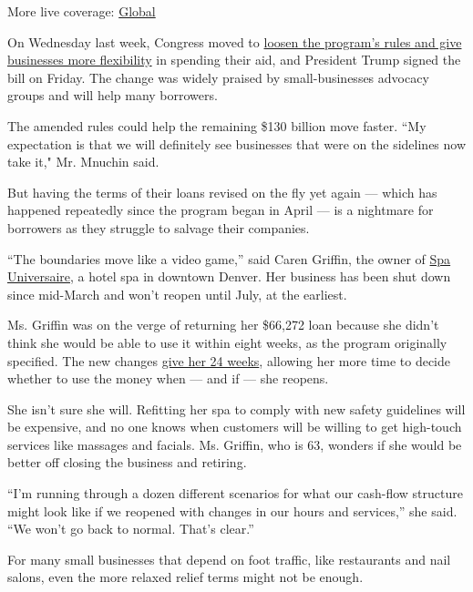 More live coverage:
\href{https://www.nytimes3xbfgragh.onion/2020/08/04/world/coronavirus-cases.html?action=click\&pgtype=Article\&state=default\&region=MAIN_CONTENT_1\&context=storylines_live_updates}{Global}

On Wednesday last week, Congress moved to
\href{https://www.nytimes3xbfgragh.onion/2020/06/03/business/stock-market-today-coronavirus.html\#link-7a1554a7}{loosen
the program's rules and give businesses more flexibility} in spending
their aid, and President Trump signed the bill on Friday. The change was
widely praised by small-businesses advocacy groups and will help many
borrowers.

The amended rules could help the remaining \$130 billion move faster.
``My expectation is that we will definitely see businesses that were on
the sidelines now take it," Mr. Mnuchin said.

But having the terms of their loans revised on the fly yet again ---
which has happened repeatedly since the program began in April --- is a
nightmare for borrowers as they struggle to salvage their companies.

``The boundaries move like a video game,'' said Caren Griffin, the owner
of \href{https://spauniversaire.com/}{Spa Universaire}, a hotel spa in
downtown Denver. Her business has been shut down since mid-March and
won't reopen until July, at the earliest.

Ms. Griffin was on the verge of returning her \$66,272 loan because she
didn't think she would be able to use it within eight weeks, as the
program originally specified. The new changes
\href{https://www.jdsupra.com/legalnews/congress-adds-more-flexibility-to-71347/}{give
her 24 weeks}, allowing her more time to decide whether to use the money
when --- and if --- she reopens.

She isn't sure she will. Refitting her spa to comply with new safety
guidelines will be expensive, and no one knows when customers will be
willing to get high-touch services like massages and facials. Ms.
Griffin, who is 63, wonders if she would be better off closing the
business and retiring.

``I'm running through a dozen different scenarios for what our cash-flow
structure might look like if we reopened with changes in our hours and
services,'' she said. ``We won't go back to normal. That's clear.''

For many small businesses that depend on foot traffic, like restaurants
and nail salons, even the more relaxed relief terms might not be enough.

